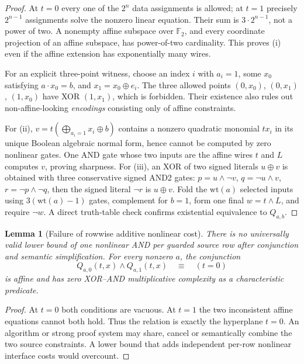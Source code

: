 \documentclass[11pt]{article}
\newtheorem{lemma}[theorem]{Lemma}
\begin{document}
\begin{proof}
At $t=0$ every one of the $2^n$ data assignments is allowed; at $t=1$ precisely $2^{n-1}$ assignments solve the nonzero linear equation. Their sum is $3\cdot 2^{n-1}$, not a power of two. A nonempty affine subspace over $\mathbb F_2$, and every coordinate projection of an affine subspace, has power-of-two cardinality. This proves (i) even if the affine extension has exponentially many wires.

For an explicit three-point witness, choose an index $i$ with $a_i=1$, some $x_0$ satisfying $a\cdot x_0=b$, and $x_1=x_0\oplus e_i$. The three allowed points $(0,x_0)$, $(0,x_1)$, $(1,x_0)$ have XOR $(1,x_1)$, which is forbidden. Their existence also rules out non-affine-looking \emph{encodings} consisting only of affine constraints.

For (ii), $v=t(\bigoplus_{a_i=1}x_i\oplus b)$ contains a nonzero quadratic monomial $tx_i$ in its unique Boolean algebraic normal form, hence cannot be computed by zero nonlinear gates. One AND gate whose two inputs are the affine wires $t$ and $L$ computes $v$, proving sharpness. For (iii), an XOR of two signed literals $u\oplus v$ is obtained with three conservative signed AND2 gates: $p=u\land\neg v$, $q=\neg u\land v$, $r=\neg p\land\neg q$, then the signed literal $\neg r$ is $u\oplus v$. Fold the $\mathrm{wt}(a)$ selected inputs using $3(\mathrm{wt}(a)-1)$ gates, complement for $b=1$, form one final $w=t\land L$, and require $\neg w$. A direct truth-table check confirms existential equivalence to $Q_{a,b}$.
\end{proof}

\begin{lemma}[Failure of rowwise additive nonlinear cost]
There is no universally valid lower bound of one nonlinear AND per \emph{guarded source row} after conjunction and semantic simplification. For every nonzero $a$, the conjunction
\[
 Q_{a,0}(t,x)\land Q_{a,1}(t,x)\quad\equiv\quad(t=0)
\]
is affine and has zero XOR--AND multiplicative complexity as a characteristic predicate.
\end{lemma}
\begin{proof}
At $t=0$ both conditions are vacuous. At $t=1$ the two inconsistent affine equations cannot both hold. Thus the relation is exactly the hyperplane $t=0$. An algorithm or strong proof system may share, cancel or semantically combine the two source constraints. A lower bound that adds independent per-row nonlinear interface costs would overcount.
\end{proof}
\end{document}
